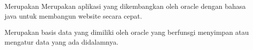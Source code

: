 Merupakan Merupakan aplikasi yang dikembangkan oleh oracle dengan bahasa java untuk membangun website secara cepat.

Merupakan basis data yang dimiliki oleh oracle yang berfunsgi menyimpan atau mengatur data yang ada didalamnya.

